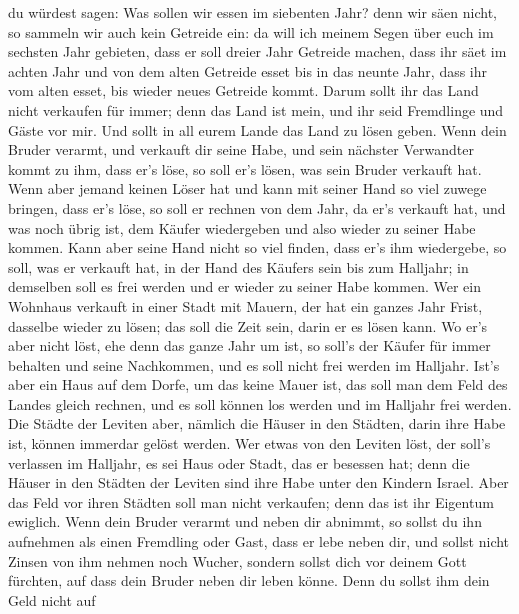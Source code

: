 du würdest sagen: Was sollen wir essen im siebenten Jahr? denn wir säen
nicht, so sammeln wir auch kein Getreide ein:  da will ich
meinem Segen über euch im sechsten Jahr gebieten, dass er soll dreier
Jahr Getreide machen,  dass ihr säet im achten Jahr und von
dem alten Getreide esset bis in das neunte Jahr, dass ihr vom alten
esset, bis wieder neues Getreide kommt.  Darum sollt ihr
das Land nicht verkaufen für immer; denn das Land ist mein, und ihr seid
Fremdlinge und Gäste vor mir.  Und sollt in all eurem Lande
das Land zu lösen geben.  Wenn dein Bruder verarmt, und
verkauft dir seine Habe, und sein nächster Verwandter kommt zu ihm, dass
er's löse, so soll er's lösen, was sein Bruder verkauft hat.
 Wenn aber jemand keinen Löser hat und kann mit seiner Hand
so viel zuwege bringen, dass er's löse,  so soll er rechnen
von dem Jahr, da er's verkauft hat, und was noch übrig ist, dem Käufer
wiedergeben und also wieder zu seiner Habe kommen.  Kann
aber seine Hand nicht so viel finden, dass er's ihm wiedergebe, so soll,
was er verkauft hat, in der Hand des Käufers sein bis zum Halljahr; in
demselben soll es frei werden und er wieder zu seiner Habe kommen.
 Wer ein Wohnhaus verkauft in einer Stadt mit Mauern, der
hat ein ganzes Jahr Frist, dasselbe wieder zu lösen; das soll die Zeit
sein, darin er es lösen kann.  Wo er's aber nicht löst, ehe
denn das ganze Jahr um ist, so soll's der Käufer für immer behalten und
seine Nachkommen, und es soll nicht frei werden im Halljahr.
 Ist's aber ein Haus auf dem Dorfe, um das keine Mauer ist,
das soll man dem Feld des Landes gleich rechnen, und es soll können los
werden und im Halljahr frei werden.  Die Städte der Leviten
aber, nämlich die Häuser in den Städten, darin ihre Habe ist, können
immerdar gelöst werden.  Wer etwas von den Leviten löst,
der soll's verlassen im Halljahr, es sei Haus oder Stadt, das er
besessen hat; denn die Häuser in den Städten der Leviten sind ihre Habe
unter den Kindern Israel.  Aber das Feld vor ihren Städten
soll man nicht verkaufen; denn das ist ihr Eigentum ewiglich.
 Wenn dein Bruder verarmt und neben dir abnimmt, so sollst
du ihn aufnehmen als einen Fremdling oder Gast, dass er lebe neben dir,
 und sollst nicht Zinsen von ihm nehmen noch Wucher,
sondern sollst dich vor deinem Gott fürchten, auf dass dein Bruder neben
dir leben könne.  Denn du sollst ihm dein Geld nicht auf
